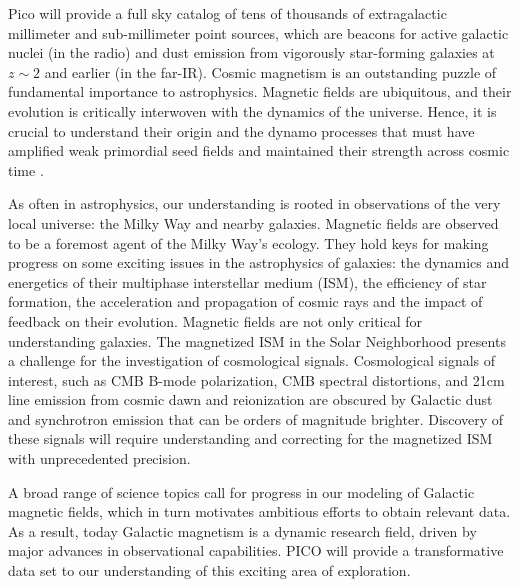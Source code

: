 \documentclass[PICOReport.tex]{subfiles}
\begin{document}
Pico will provide a full sky catalog of tens of thousands of
extragalactic millimeter and sub-millimeter point sources, which are
beacons for active galactic nuclei (in the radio) and dust emission
from vigorously star-forming galaxies at $z \sim 2$ and earlier (in
the far-IR).
Cosmic magnetism is an outstanding puzzle of fundamental importance to astrophysics. Magnetic fields are ubiquitous, and their evolution is critically interwoven with the dynamics of the universe. Hence, it is crucial to understand
their origin and the dynamo processes that must have amplified weak  primordial seed fields 
and maintained their strength across cosmic time \citep{Brandenburg2005}. 

As often in astrophysics, our understanding is rooted in 
observations of the very local universe: the Milky Way and nearby galaxies. Magnetic fields are observed to be a foremost agent of the 
Milky Way's ecology. They hold keys for making progress on some exciting issues in the astrophysics of galaxies: the dynamics and 
energetics of their multiphase interstellar medium (ISM), the efficiency of star formation, the acceleration and propagation of cosmic rays and the 
impact of feedback on their evolution. Magnetic fields are not only critical for understanding galaxies. 
The magnetized ISM in the Solar Neighborhood presents a challenge for the investigation of cosmological signals. 
Cosmological signals of interest, such as CMB B-mode polarization, CMB spectral distortions, and 21cm line emission from cosmic dawn and reionization are obscured by Galactic dust and synchrotron emission that can be orders of magnitude brighter. Discovery of these signals will require understanding and correcting for the magnetized ISM with unprecedented precision.  

A broad range of science topics call for progress in our modeling of Galactic magnetic fields, which in turn 
motivates ambitious efforts to obtain relevant data. 
As a result, today Galactic magnetism is a dynamic research field, driven by major advances in observational capabilities. PICO will provide a transformative data set to our understanding of this exciting area of exploration.
\end{document}
